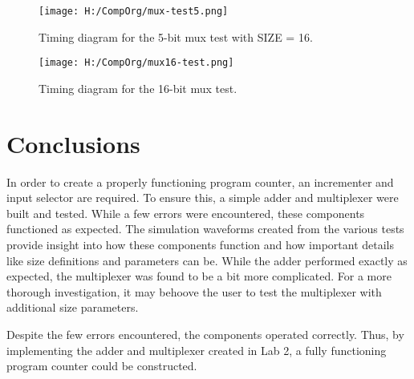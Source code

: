 \documentclass{article}
\begin{document}
\begin{figure}
	\begin{center}
		\caption{Timing diagram for the 5-bit mux test with SIZE = 16.}\label{fig:mux5test}
		\texttt{[image: H:/CompOrg/mux-test5.png]}
	\end{center}
\end{figure}

\begin{figure}
\begin{center}
\caption{Timing diagram for the 16-bit mux test.}\label{fig:mux16test}
\texttt{[image: H:/CompOrg/mux16-test.png]}
\end{center}
\end{figure}



\section{Conclusions}
In order to create a properly functioning program counter, an incrementer and input selector are required. To ensure this, a simple adder and multiplexer were built and tested. While a few errors were encountered, these components functioned as expected. The simulation waveforms created from the various tests provide insight into how these components function and how important details like size definitions and parameters can be. While the adder performed exactly as expected, the multiplexer was found to be a bit more complicated. For a more thorough investigation, it may behoove the user to test the multiplexer with additional size parameters. 

Despite the few errors encountered, the components operated correctly. Thus, by implementing the adder and multiplexer created in Lab 2, a fully functioning program counter could be constructed.
\end{document}
